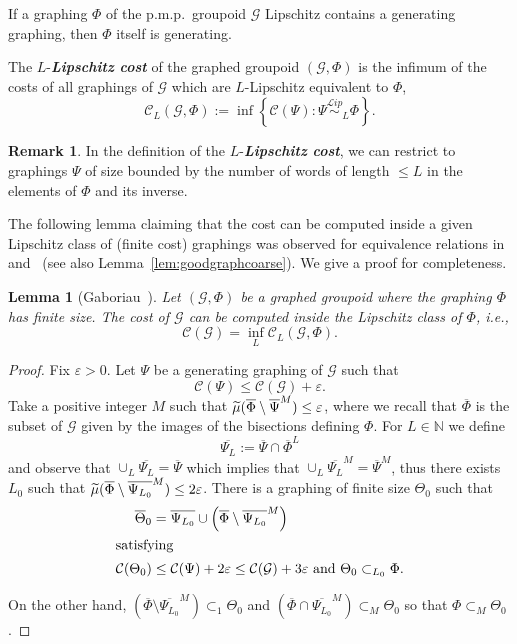 \documentclass[10pt]{amsart}
\newtheorem{lemm}[cdrthm]{Lemma}
\theoremstyle{definition}
\newtheorem{rema}[cdrthm]{Remark}
\newcommand{\defin}[1]{\textbf{\emph{#1}}}
\newcommand{\Nmath}{\mathbb{N}}
\newcommand{\cost}{\mathcal{C}}
\newcommand{\cg}{\mathcal{G}}
\newcommand{\eps}{\varepsilon}
\newcommand{\pmp}{p.m.p.\ }
\newcommand\Lipeq{\overset{\mathcal{L}ip}{\sim}}
\let\oldtilde\tilde
\renewcommand*{\tilde}[1]{\mathchoice{\widetilde{#1}}{\widetilde{#1}}{\oldtilde{#1}}{\oldtilde{#1}}}
\begin{document}
If a graphing $\Phi$ of the \pmp groupoid $\cg$ Lipschitz contains a generating graphing, then $\Phi$ itself is generating.

The $L$-\defin{Lipschitz cost} of the graphed groupoid $(\cg,\Phi)$ is the infimum of the costs of all graphings of $\cg$ which are $L$-Lipschitz equivalent to $\Phi$,
\[
\cost_L(\cg,\Phi):=\inf\left\{\cost(\Psi)\colon \Psi\Lipeq_L\Phi \right\}.
\]

\begin{rema}\label{rem:for_Lipschitz_cost}
In the definition of the $L$-\defin{Lipschitz cost}, we can restrict to graphings $\Psi$ of size bounded by the number of words of length $\leq L$ in the elements of $\Phi$ and its inverse.
\end{rema}

The following lemma claiming that the cost can be computed inside a given Lipschitz class of (finite cost) graphings was observed for equivalence relations in~\cite[Étape 1]{Gab-CRAS-cost} and~\cite{Gab-cost} (see also Lemma~\ref{lem:goodgraphcoarse}). We give a proof for completeness.
\begin{lemm}[{Gaboriau~\cite[Proposition~IV.35]{Gab-cost}}]\label{lem:goodgraph}
Let $(\cg,\Phi)$ be a graphed groupoid where the graphing $\Phi$ has finite size. The cost of $\cg$ can be computed inside the Lipschitz class of $\Phi$, i.e.,
\begin{equation}
\cost(\cg)=\inf_L\cost_L(\cg,\Phi).
\end{equation}
\end{lemm}
\begin{proof}
Fix $\eps>0$. Let $\Psi$ be a generating graphing of $\cg$ such that
\[
\cost(\Psi)\leq \cost(\cg)+\eps.
\]
Take a positive integer $M$ such that $\tilde\mu(\overline\Phi\setminus\overline\Psi^M)\leq\eps$, where we recall that $\overline\Phi$ is the subset of $\cg$ given by the images of the bisections defining $\Phi$. For $L\in\Nmath$ we define
\[
\overline{\Psi_L}:=\overline\Psi\cap \overline{\Phi}^L
\]
and observe that $\cup_L \overline{\Psi_L}=\overline\Psi$ which implies that $\cup_L \overline{\Psi_L}^M=\overline\Psi^M$, thus there exists $L_0$ such that $\tilde\mu(\overline\Phi\setminus \overline{\Psi_{L_0}}^M)\leq 2\eps$. There is a graphing of finite size $\Theta_0$ such that
\begin{align*}
\overline\Theta_0 &=\overline {\Psi_{L_0}}\cup\left(\overline\Phi\setminus \overline{\Psi_{L_0}}^M\right)\\
\intertext{satisfying}
\cost(\Theta_0)&\leq \cost(\Psi)+2\eps\leq \cost(\cg)+3\eps\text{ and }\Theta_0\subset_{L_0}\Phi.
\end{align*}

On the other hand, $(\overline\Phi\setminus \overline{\Psi_{L_0}}^M)\subset_1 \Theta_0$ and $(\overline\Phi\cap \overline{\Psi_{L_0}}^M)\subset_{M} \Theta_0$ so that $\Phi\subset_M \Theta_0$.
\end{proof}
\end{document}
